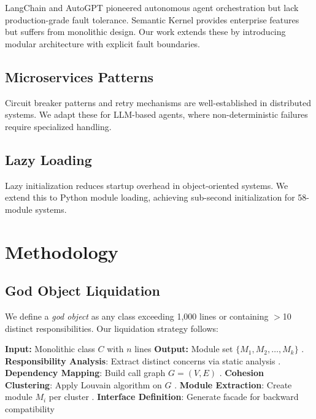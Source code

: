 \documentclass[conference]{IEEEtran}
\begin{document}
LangChain \cite{langchain2023} and AutoGPT \cite{autogpt2023} pioneered autonomous agent orchestration but lack production-grade fault tolerance. Semantic Kernel \cite{semantickernel2023} provides enterprise features but suffers from monolithic design. Our work extends these by introducing modular architecture with explicit fault boundaries.

\subsection{Microservices Patterns}

Circuit breaker patterns \cite{nygard2007release} and retry mechanisms \cite{tanenbaum2007distributed} are well-established in distributed systems. We adapt these for LLM-based agents, where non-deterministic failures require specialized handling.

\subsection{Lazy Loading}

Lazy initialization \cite{gamma1995design} reduces startup overhead in object-oriented systems. We extend this to Python module loading, achieving sub-second initialization for 58-module systems.

\section{Methodology}

\subsection{God Object Liquidation}

We define a \textit{god object} as any class exceeding 1,000 lines or containing $>$10 distinct responsibilities. Our liquidation strategy follows:

\begin{algorithmic}
\STATE \textbf{Input:} Monolithic class $C$ with $n$ lines
\STATE \textbf{Output:} Module set $\{M_1, M_2, \ldots, M_k\}$
\STATE
{}. \textbf{Responsibility Analysis}: Extract distinct concerns via static analysis
. \textbf{Dependency Mapping}: Build call graph $G = (V, E)$
. \textbf{Cohesion Clustering}: Apply Louvain algorithm on $G$
. \textbf{Module Extraction}: Create module $M_i$ per cluster
. \textbf{Interface Definition}: Generate facade for backward compatibility
\end{algorithmic}
\end{document}
